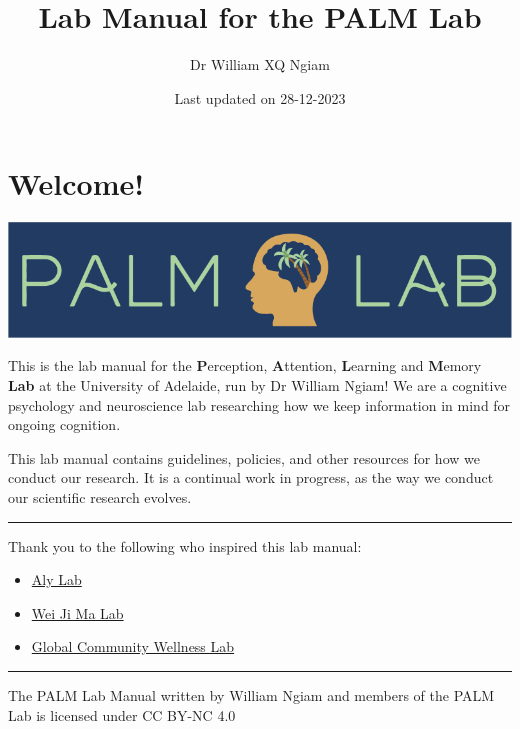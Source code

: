 \documentclass[
]{book}
\title{Lab Manual for the PALM Lab}
\author{Dr William XQ Ngiam}
\date{Last updated on 28-12-2023}
\providecommand{\tightlist}{%
  \setlength{\itemsep}{0pt}\setlength{\parskip}{0pt}}
\begin{document}
\maketitle

{
\setcounter{tocdepth}{1}
\tableofcontents
}
\hypertarget{welcome}{%
\chapter*{Welcome!}\label{welcome}}

\includegraphics{images/banner_1.png}

This is the lab manual for the \textbf{P}erception, \textbf{A}ttention, \textbf{L}earning and \textbf{M}emory \textbf{Lab} at the University of Adelaide, run by Dr William Ngiam! We are a cognitive psychology and neuroscience lab researching how we keep information in mind for ongoing cognition.

This lab manual contains guidelines, policies, and other resources for how we conduct our research. It is a continual work in progress, as the way we conduct our scientific research evolves.

\begin{center}\rule{0.5\linewidth}{0.5pt}\end{center}

Thank you to the following who inspired this lab manual:

\begin{itemize}
\tightlist
\item
  \href{https://github.com/alylab/labmanual/blob/master/aly-lab-manual.pdf}{Aly Lab}
\item
  \href{https://www.cns.nyu.edu/malab/lablife.html}{Wei Ji Ma Lab}
\item
  \href{https://bookdown.org/jordandanielsnyder/LabManual/expectations-and-responsiblities.html}{Global Community Wellness Lab}
\end{itemize}

\begin{center}\rule{0.5\linewidth}{0.5pt}\end{center}

The PALM Lab Manual written by William Ngiam and members of the PALM Lab is licensed under CC BY-NC 4.0
\end{document}
